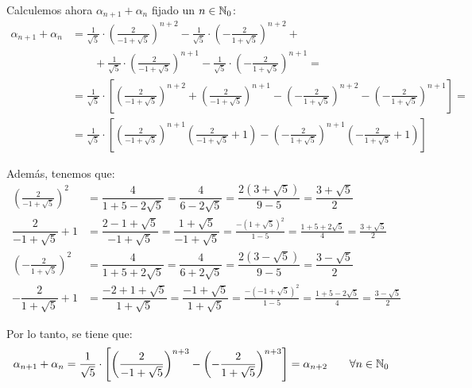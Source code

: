 \begin{ejercicio}
    Calculemos ahora $\alpha_{n+1}+\alpha_{n}$ fijado un $n\in \mathbb{N}_0$:
    \begin{align*}
        \alpha_{n+1}+\alpha_{n} &= \frac{1}{\sqrt{5}}\cdot \left(\frac{2}{-1+\sqrt{5}}\right)^{n+2}-\frac{1}{\sqrt{5}}\cdot \left(-\frac{2}{1+\sqrt{5}}\right)^{n+2} +\\&\qquad +
        \frac{1}{\sqrt{5}}\cdot \left(\frac{2}{-1+\sqrt{5}}\right)^{n+1}-\frac{1}{\sqrt{5}}\cdot \left(-\frac{2}{1+\sqrt{5}}\right)^{n+1} =\\
        &= \frac{1}{\sqrt{5}}\cdot \left[\left(\frac{2}{-1+\sqrt{5}}\right)^{n+2}+\left(\frac{2}{-1+\sqrt{5}}\right)^{n+1} - \left(-\frac{2}{1+\sqrt{5}}\right)^{n+2}-\left(-\frac{2}{1+\sqrt{5}}\right)^{n+1}\right]
        =\\&= \frac{1}{\sqrt{5}}\cdot \left[\left(\frac{2}{-1+\sqrt{5}}\right)^{n+1}\left(\frac{2}{-1+\sqrt{5}}+1\right) - \left(-\frac{2}{1+\sqrt{5}}\right)^{n+1}\left(-\frac{2}{1+\sqrt{5}}+1\right)\right]
    \end{align*}

    Además, tenemos que:
    \begin{align*}
        \left(\frac{2}{-1+\sqrt{5}}\right)^2 &= \dfrac{4}{1+5-2\sqrt{5}} = \dfrac{4}{6-2\sqrt{5}} = \dfrac{2(3+\sqrt{5})}{9-5}=\dfrac{3+\sqrt{5}}{2}\\
        \dfrac{2}{-1+\sqrt{5}}+1 &= \dfrac{2-1+\sqrt{5}}{-1+\sqrt{5}} = \dfrac{1+\sqrt{5}}{-1+\sqrt{5}} = \frac{-(1+\sqrt{5})^2}{1-5}=\frac{1+5+2\sqrt{5}}{4} = \frac{3+\sqrt{5}}{2}\\
        \left(-\frac{2}{1+\sqrt{5}}\right)^2 &= \dfrac{4}{1+5+2\sqrt{5}} = \dfrac{4}{6+2\sqrt{5}} = \dfrac{2(3-\sqrt{5})}{9-5}=\dfrac{3-\sqrt{5}}{2}\\
        -\dfrac{2}{1+\sqrt{5}}+1 &= \dfrac{-2+1+\sqrt{5}}{1+\sqrt{5}} = \dfrac{-1+\sqrt{5}}{1+\sqrt{5}} = \frac{-(-1+\sqrt{5})^2}{1-5}=\frac{1+5-2\sqrt{5}}{4} = \frac{3-\sqrt{5}}{2}
    \end{align*}

    Por lo tanto, se tiene que:
    \begin{align*}
        \alpha_{n+1}+\alpha_{n} &= \frac{1}{\sqrt{5}}\cdot \left[\left(\frac{2}{-1+\sqrt{5}}\right)^{n+3}-\left(-\frac{2}{1+\sqrt{5}}\right)^{n+3}\right]
        = \alpha_{n+2}
        \qquad \forall n \in \mathbb{N}_0
    \end{align*}


\end{ejercicio}

